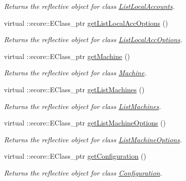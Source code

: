 \begin{DoxyCompactItemize}
\begin{DoxyCompactList}\small\item\em Returns the reflective object for class \hyperlink{classUMS__Data_1_1ListLocalAccounts}{ListLocalAccounts}. \item\end{DoxyCompactList}\item 
virtual ::ecore::EClass\_\-ptr \hyperlink{classUMS__Data_1_1UMS__DataPackage_af7707c8f0d01a4b8864690ca88dbd8c8}{getListLocalAccOptions} ()
\begin{DoxyCompactList}\small\item\em Returns the reflective object for class \hyperlink{classUMS__Data_1_1ListLocalAccOptions}{ListLocalAccOptions}. \item\end{DoxyCompactList}\item 
virtual ::ecore::EClass\_\-ptr \hyperlink{classUMS__Data_1_1UMS__DataPackage_a1bfd05e1d5e394baa5785b91633a3528}{getMachine} ()
\begin{DoxyCompactList}\small\item\em Returns the reflective object for class \hyperlink{classUMS__Data_1_1Machine}{Machine}. \item\end{DoxyCompactList}\item 
virtual ::ecore::EClass\_\-ptr \hyperlink{classUMS__Data_1_1UMS__DataPackage_afc092aae479cf5d4976796199b87d979}{getListMachines} ()
\begin{DoxyCompactList}\small\item\em Returns the reflective object for class \hyperlink{classUMS__Data_1_1ListMachines}{ListMachines}. \item\end{DoxyCompactList}\item 
virtual ::ecore::EClass\_\-ptr \hyperlink{classUMS__Data_1_1UMS__DataPackage_a1d29ff8a5d95253301ff3d90066171e7}{getListMachineOptions} ()
\begin{DoxyCompactList}\small\item\em Returns the reflective object for class \hyperlink{classUMS__Data_1_1ListMachineOptions}{ListMachineOptions}. \item\end{DoxyCompactList}\item 
virtual ::ecore::EClass\_\-ptr \hyperlink{classUMS__Data_1_1UMS__DataPackage_a44db860d72b32aab1a3048510ecaf29d}{getConfiguration} ()
\begin{DoxyCompactList}\small\item\em Returns the reflective object for class \hyperlink{classUMS__Data_1_1Configuration}{Configuration}. \item\end{DoxyCompactList}\item 

\end{DoxyCompactItemize}
